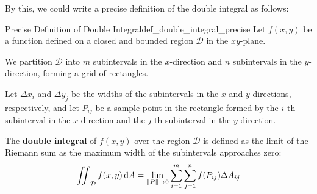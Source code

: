 \begin{center}
\end{center}


By this, we could write a precise definition of the double integral as follows:
\begin{definition}{Precise Definition of Double Integral}{def_double_integral_precise}
Let $f(x, y)$ be a function defined on a closed and bounded region $\mathcal{D}$ in the $xy$-plane.

We partition $\mathcal{D}$ into $m$ subintervals in the $x$-direction and $n$ subintervals in the $y$-direction, forming a grid of rectangles.

Let $\Delta x_i$ and $\Delta y_j$ be the widths of the subintervals in the $x$ and $y$ directions, respectively,
and let $P_{ij}$ be a sample point in the rectangle formed by the $i$-th subinterval in the $x$-direction and the $j$-th subinterval in the $y$-direction.

The \textbf{double integral} of $f(x, y)$ over the region $\mathcal{D}$ is defined as the limit of the Riemann sum as the maximum width of the subintervals approaches zero:
\[
    \mathop{\int\mkern-10mu\int}\nolimits_{\mathcal{D}} f(x, y) \, \mathrm{d}A = \lim_{\norm{P} \to 0} \sum_{i=1}^m \sum_{j=1}^n f(P_{ij}) \Delta A_{ij}
\]
\end{definition}

